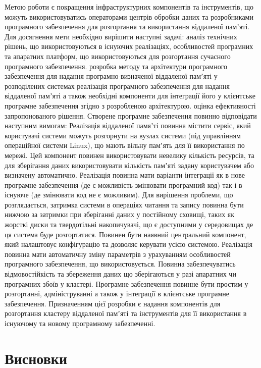 Метою роботи є покращення інфраструктурних компонентів та інструментів, що можуть використовуватись операторами центрів обробки даних та розробниками програмного забезпечення для розгортання та використання віддаленої памʼяті. Для досягнення мети необхідно вирішити наступні задачі:
аналіз технічних рішень, що використовуються в існуючих реалізаціях, особливостей програмних та апаратних платформ, що використовуються для розгортання сучасного програмного забезпечення.
розробка методу та архітектури програмного забезпечення для надання програмно-визначеної віддаленої памʼяті у розподілених системах
реалізація програмного забезпечення для надання віддаленої памʼяті а також необхідні компоненти для інтеграції його у клієнтське програмне забезпечення згідно з розробленою архітектурою.
оцінка ефективності запропонованого рішення.
Створене програмне забезпечення повинно відповідати наступним вимогам:
Реалізація віддаленої памяʼті повинна містити сервіс, який користувачі системи можуть розгорнути на вузлах системи (під управлінням операційної системи Linux), що мають вільну памʼять для її використання по мережі. Цей компонент повинен використовувати невелику кількість ресурсів, та для зберігання даних використовувати кількість памʼяті задану користувачем або визначену автоматично.
Реалізація повинна мати варіанти інтеграції як в нове програмне забезпечення (де є можливість змінювати програмний код) так і в існуюче (де змінювати код не є можливим).
Для вирішення проблеми, що розглядається, затримка системи в операціях читання та запису повинна бути нижчою за затримки при зберіганні даних у постійному сховищі, таких як жорсткі диски та твердотільні накопичувачі, що є доступними у середовищах де ця система буде розгортатися.
Повинен бути наявний центральний компонент, який налаштовує конфігурацію та дозволяє керувати усією системою.
Реалізація повинна мати автоматичну зміну параметрів з урахуванням особливостей програмного забезпечення, що використовується.
Повинна забезпечуватись відмовостійкість та збереження даних що зберігаються у разі апаратних чи програмних збоїв у кластері.
Програмне забезпечення повинне бути простим у розгортанні,  адмініструванні а також у інтеграції в клієнтське програмне забезпечення.
	Призначенням цієї розробки є надання компонентів для розгортання кластеру віддаленої памʼяті та інструментів для її використання в існуючому та новому програмному забезпеченні.

\section{Висновки}

